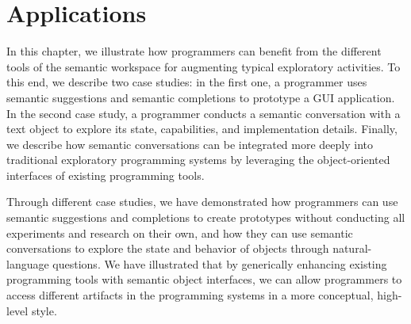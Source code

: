 
\chapter{Applications}
\label{cha:application}

In this chapter, we illustrate how programmers can benefit from the different tools of the semantic workspace for augmenting typical exploratory activities.
To this end, we describe two case studies: in the first one, a programmer uses semantic suggestions and semantic completions to prototype a GUI application.
In the second case study, a programmer conducts a semantic conversation with a text object to explore its state, capabilities, and implementation details.
Finally, we describe how semantic conversations can be integrated more deeply into traditional exploratory programming systems by leveraging the object-oriented interfaces of existing programming tools.

\pagebreak
{}

\begin{summary}
	Through different case studies, we have demonstrated how programmers can use semantic suggestions and completions to create prototypes without conducting all experiments and research on their own, and how they can use semantic conversations to explore the state and behavior of objects through natural-language questions.
	We have illustrated that by generically enhancing existing programming tools with semantic object interfaces, we can allow programmers to access different artifacts in the programming systems in a more conceptual, high-level style.
\end{summary}
